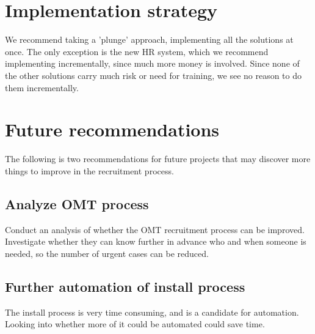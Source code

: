 \section{Implementation strategy}
We recommend taking a 'plunge' approach, implementing all the solutions at once.
The only exception is the new HR system, which we recommend implementing incrementally, since much more money is involved.
Since none of the other solutions carry much risk or need for training, we see no reason to do them incrementally.

\section{Future recommendations}
The following is two recommendations for future projects that may discover more things to improve in the recruitment process.

\subsection{Analyze OMT process}
Conduct an analysis of whether the OMT recruitment process can be improved.
Investigate whether they can know further in advance who and when someone is needed, so the number of urgent cases can be reduced.

\subsection{Further automation of install process}
The install process is very time consuming, and is a candidate for automation.
Looking into whether more of it could be automated could save time.
